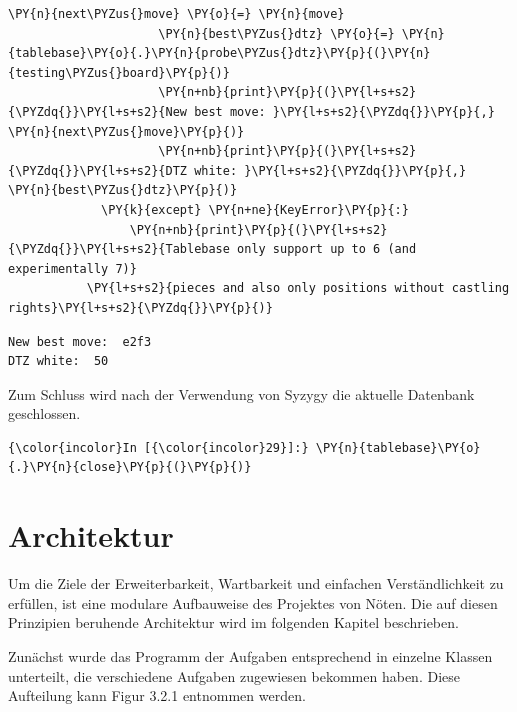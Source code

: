 \begin{Verbatim}[commandchars=\\\{\}]
                     \PY{n}{next\PYZus{}move} \PY{o}{=} \PY{n}{move}
                     \PY{n}{best\PYZus{}dtz} \PY{o}{=} \PY{n}{tablebase}\PY{o}{.}\PY{n}{probe\PYZus{}dtz}\PY{p}{(}\PY{n}{testing\PYZus{}board}\PY{p}{)}
                     \PY{n+nb}{print}\PY{p}{(}\PY{l+s+s2}{\PYZdq{}}\PY{l+s+s2}{New best move: }\PY{l+s+s2}{\PYZdq{}}\PY{p}{,} \PY{n}{next\PYZus{}move}\PY{p}{)}
                     \PY{n+nb}{print}\PY{p}{(}\PY{l+s+s2}{\PYZdq{}}\PY{l+s+s2}{DTZ white: }\PY{l+s+s2}{\PYZdq{}}\PY{p}{,} \PY{n}{best\PYZus{}dtz}\PY{p}{)}
             \PY{k}{except} \PY{n+ne}{KeyError}\PY{p}{:}
                 \PY{n+nb}{print}\PY{p}{(}\PY{l+s+s2}{\PYZdq{}}\PY{l+s+s2}{Tablebase only support up to 6 (and experimentally 7)}
		   \PY{l+s+s2}{pieces and also only positions without castling rights}\PY{l+s+s2}{\PYZdq{}}\PY{p}{)}
\end{Verbatim}


    \begin{Verbatim}[commandchars=\\\{\}]
New best move:  e2f3
DTZ white:  50

    \end{Verbatim}

    Zum Schluss wird nach der Verwendung von Syzygy die aktuelle Datenbank
geschlossen.

    \begin{Verbatim}[commandchars=\\\{\}]
{\color{incolor}In [{\color{incolor}29}]:} \PY{n}{tablebase}\PY{o}{.}\PY{n}{close}\PY{p}{(}\PY{p}{)}
\end{Verbatim}



\section{Architektur}\label{architektur}

Um die Ziele der Erweiterbarkeit, Wartbarkeit und einfachen Verständlichkeit zu erfüllen, ist eine modulare Aufbauweise des Projektes von Nöten. Die auf diesen Prinzipien beruhende Architektur wird im folgenden Kapitel beschrieben.

Zunächst wurde das Programm der Aufgaben entsprechend in einzelne Klassen unterteilt, die verschiedene Aufgaben zugewiesen bekommen haben. Diese Aufteilung kann Figur 3.2.1 entnommen werden.

